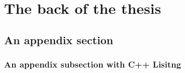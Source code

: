 \documentclass[a4paper,11pt]{mscThesis}
\begin{document}
    \printnomenclature
    \cleardoublepage
%
%
%
\mainmatter
%
\cleardoublepage

%
		
    	
    	
    	
    	
    	
    	

%
    


\appendix

    \chapter{The back of the thesis}

    \section{An appendix section}

    \subsection{An appendix subsection with C++ Lisitng}

    \lstset{language=C++}
    
\end{document}
